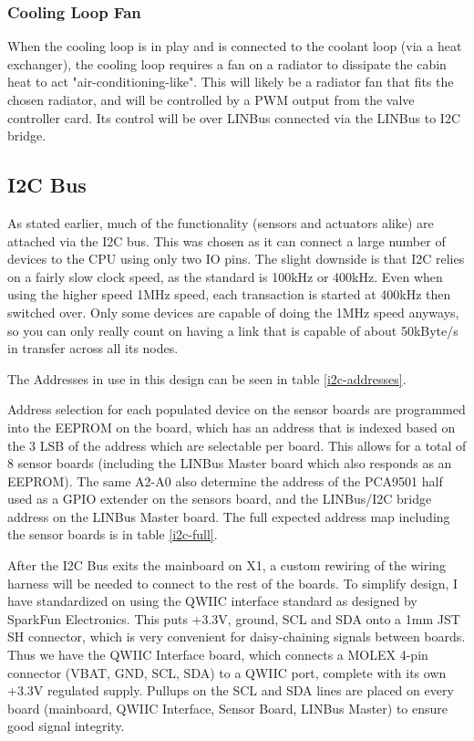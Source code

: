 \documentclass[lettersize,journal]{IEEEtran}
\begin{document}
\subsubsection{Cooling Loop Fan}
When the cooling loop is in play and is connected to the coolant loop (via a heat exchanger), the cooling loop requires a fan on a radiator to dissipate the cabin heat to act "air-conditioning-like".  This will likely be a radiator fan that fits the chosen radiator, and will be controlled by a PWM output from the valve controller card.  Its control will be over LINBus connected via the LINBus to I2C bridge.

\subsection{I2C Bus}

As stated earlier, much of the functionality (sensors and actuators alike) are attached via the I2C bus.  This was chosen as it can connect a large number of devices to the CPU using only two IO pins.  The slight downside is that I2C relies on a fairly slow clock speed, as the standard is 100kHz or 400kHz.  Even when using the higher speed 1MHz speed, each transaction is started at 400kHz then switched over.  Only some devices are capable of doing the 1MHz speed anyways, so you can only really count on having a link that is capable of about 50kByte/s in transfer across all its nodes.

The Addresses in use in this design can be seen in table \ref{i2c-addresses}.

Address selection for each populated device on the sensor boards are programmed into the EEPROM on the board, which has an address that is indexed based on the 3 LSB of the address which are selectable per board.  This allows for a total of 8 sensor boards (including the LINBus Master board which also responds as an EEPROM).  The same A2-A0 also determine the address of the PCA9501 half used as a GPIO extender on the sensors board, and the LINBus/I2C bridge address on the LINBus Master board.  The full expected address map including the sensor boards is in table \ref{i2c-full}.

After the I2C Bus exits the mainboard on X1, a custom rewiring of the wiring harness will be needed to connect to the rest of the boards.  To simplify design, I have standardized on using the QWIIC interface standard as designed by SparkFun Electronics.  This puts +3.3V, ground, SCL and SDA onto a 1mm JST SH connector, which is very convenient for daisy-chaining signals between boards.  Thus we have the QWIIC Interface board, which connects a MOLEX 4-pin connector (VBAT, GND, SCL, SDA) to a QWIIC port, complete with its own +3.3V regulated supply.  Pullups on the SCL and SDA lines are placed on every board (mainboard, QWIIC Interface, Sensor Board, LINBus Master) to ensure good signal integrity.
\end{document}
